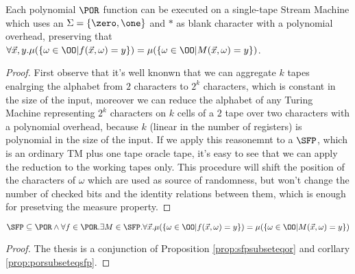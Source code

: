 \begin{corollary}
\label{prop:porsubseteqsfp}
Each polynomial $\POR$ function can be executed on a single-tape Stream Machine which uses an $\Sigma=\{\zero, \one\}$ and $*$ as blank character with a polynomial overhead, preserving that$\forall \vec x, y. \mu(\{\omega \in \OO | f(\vec x, \omega) = y\})=\mu(\{\omega \in \OO| M(\vec x, \omega) = y\})$.
\end{corollary}
\begin{proof}
First observe that it's well knonwn that we can aggregate $k$ tapes enalrging the alphabet from $2$ characters to $2^k$ characters, which is constant in the size of the input, moreover we can reduce the alphabet of any Turing Machine representing $2^k$ characters on $k$ cells of a $2$ tape over two characters with a polynomial overhead, because $k$ (linear in the number of registers) is polynomial in the size of the input. If we apply this reasonemnt to a $\SFP$, which is an ordinary TM plus one tape oracle tape, it's easy to see that we can apply the reduction to the working tapes only. This procedure will shift the position of the characters of $\omega$ which are used as source of randomness, but won't change the number of checked bits and the identity relations between them, which is enough for presetving the measure property.
\end{proof}

\begin{theorem}
\label{thm:por=sfp}
$\SFP\subseteq\POR\land \forall f \in \POR. \exists M \in \SFP.\forall \vec x. \mu(\{\omega \in \OO | f(\vec x, \omega) = y\})=\mu(\{\omega \in \OO| M(\vec x, \omega) = y\})$
\end{theorem}
\begin{proof}
The thesis is a conjunction of Proposition \ref{prop:sfpsubseteqor} and corllary \ref{prop:porsubseteqsfp}.
\end{proof}
